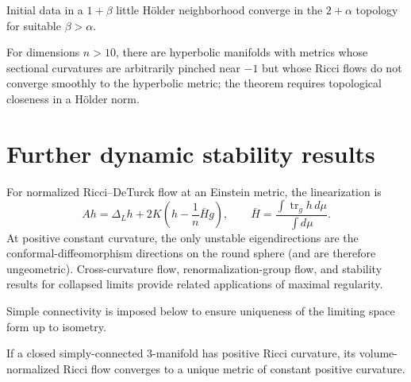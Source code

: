 \begin{remark}
\label{rem:chow-iv-negative-curvature-regularity}

Initial data in a $1+\beta$ little H\"older neighborhood converge in the
$2+\alpha$ topology for suitable $\beta>\alpha$.
\end{remark}

\begin{remark}
\label{rem:chow-iv-negative-curvature-obstruction}

For dimensions $n>10$, there are hyperbolic manifolds with metrics whose
sectional curvatures are arbitrarily pinched near $-1$ but whose Ricci flows
do not converge smoothly to the hyperbolic metric; the theorem requires
topological closeness in a H\"older norm.
\end{remark}

\section{Further dynamic stability results}

For normalized Ricci--DeTurck flow at an Einstein metric, the linearization is
\begin{equation*}
 Ah=\Delta_Lh+2K\left(h-\frac1n\bar H g\right),
 \qquad \bar H=\frac{\int\operatorname{tr}_gh\,d\mu}{\int d\mu}.
 \tag{35.26}
\end{equation*}
At positive constant curvature, the only unstable eigendirections are the
conformal-diffeomorphism directions on the round sphere (and are therefore
ungeometric).  Cross-curvature flow, renormalization-group flow, and stability
results for collapsed limits provide related applications of maximal regularity.

\begin{remark}
\label{rem:chow-iv-positive-curvature-stability}

Simple connectivity is imposed below to ensure uniqueness of the limiting
space form up to isometry.
\end{remark}

\begin{theorem}
\label{thm:chow-iv-hamilton-positive-ricci}

If a closed simply-connected $3$-manifold has positive Ricci curvature, its
volume-normalized Ricci flow converges to a unique metric of constant positive
curvature.
\end{theorem}

